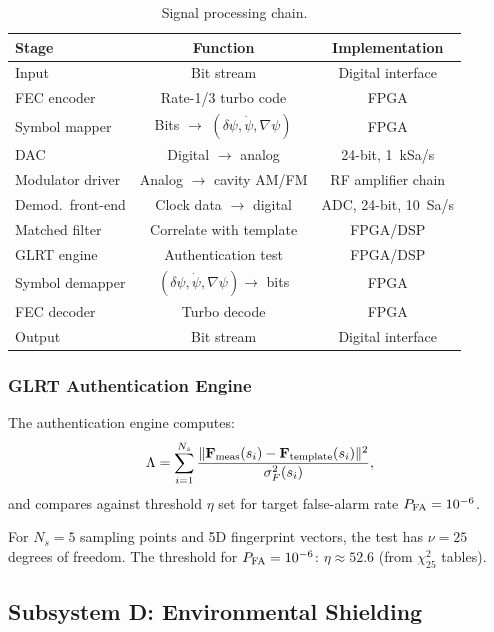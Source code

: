 \documentclass[11pt,onecolumn]{article}
\begin{document}
\begin{table}[H]
\centering
\caption{Signal processing chain.}
\label{tab:signal-chain}
\begin{tabular}{lcc}
\toprule
Stage & Function & Implementation \\
\midrule
Input & Bit stream & Digital interface \\
FEC encoder & Rate-1/3 turbo code & FPGA \\
Symbol mapper & Bits $\to$ $(\delta\psi, \dot\psi, \nabla\psi)$ & FPGA \\
DAC & Digital $\to$ analog & 24-bit, 1~kSa/s \\
Modulator driver & Analog $\to$ cavity AM/FM & RF amplifier chain \\
\midrule
Demod.\ front-end & Clock data $\to$ digital & ADC, 24-bit, 10~Sa/s \\
Matched filter & Correlate with template & FPGA/DSP \\
GLRT engine & Authentication test & FPGA/DSP \\
Symbol demapper & $(\delta\psi, \dot\psi, \nabla\psi) \to$ bits & FPGA \\
FEC decoder & Turbo decode & FPGA \\
Output & Bit stream & Digital interface \\
\bottomrule
\end{tabular}
\end{table}

\subsubsection{GLRT Authentication Engine}

The authentication engine computes:
\begin{equation}
\Lambda = \sum_{i=1}^{N_s}
\frac{\|\mathbf{F}_{\rm meas}(s_i) - \mathbf{F}_{\rm template}(s_i)\|^2}
{\sigma_F^2(s_i)},
\end{equation}
and compares against threshold $\eta$ set for target false-alarm rate
$P_{\rm FA} = 10^{-6}$.

For $N_s = 5$ sampling points and 5D fingerprint vectors, the test has
$\nu = 25$ degrees of freedom.
The threshold for $P_{\rm FA} = 10^{-6}$:
$\eta \approx 52.6$ (from $\chi^2_{25}$ tables).

\subsection{Subsystem D: Environmental Shielding}
\end{document}
